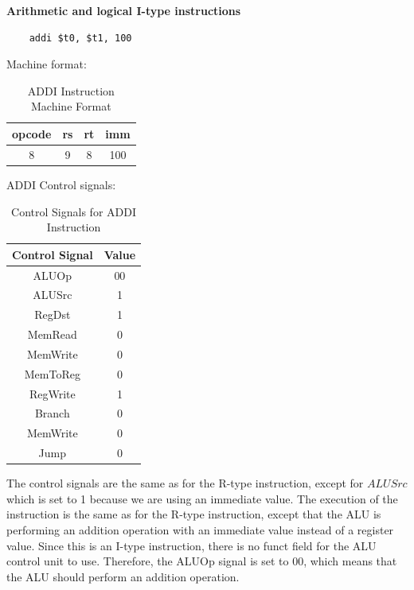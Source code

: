 \textbf{Arithmetic and logical I-type instructions}\newline
\begin{verbatim}
    addi $t0, $t1, 100
\end{verbatim}
Machine format:
\begin{table}[H]
    \centering
    \begin{tabular}{|c|c|c|c|}
    \hline
    \textbf{opcode} & \textbf{rs} & \textbf{rt} & \textbf{imm} \\ \hline
    8             & 9          & 8          & 100          \\ \hline
    \end{tabular}
    \caption{ADDI Instruction Machine Format}
    \label{tab:addi_instruction}
\end{table}

ADDI Control signals:
\begin{table}[H]
    \centering
    \begin{tabular}{|c|c|}
    \hline
    \textbf{Control Signal} & \textbf{Value} \\ \hline
    ALUOp                   & 00             \\ \hline
    ALUSrc                  & 1             \\ \hline
    RegDst                  & 1             \\ \hline
    MemRead                 & 0             \\ \hline
    MemWrite                & 0             \\ \hline
    MemToReg                & 0             \\ \hline
    RegWrite                & 1             \\ \hline
    Branch                  & 0             \\ \hline
    MemWrite                 & 0             \\ \hline
    Jump                 & 0             \\ \hline
    \end{tabular}
    \caption{Control Signals for ADDI Instruction}
    \label{tab:addi_control_signals}
\end{table}

The control signals are the same as for the R-type instruction, except for $ALUSrc$ which is set to 1 because we are using an immediate value. The execution of the instruction is the same as for the R-type instruction, except that the ALU is performing an addition operation with an immediate value instead of a register value. Since this is an I-type instruction, there is no funct field for the ALU control unit to use. Therefore, the ALUOp signal is set to 00, which means that the ALU should perform an addition operation.

